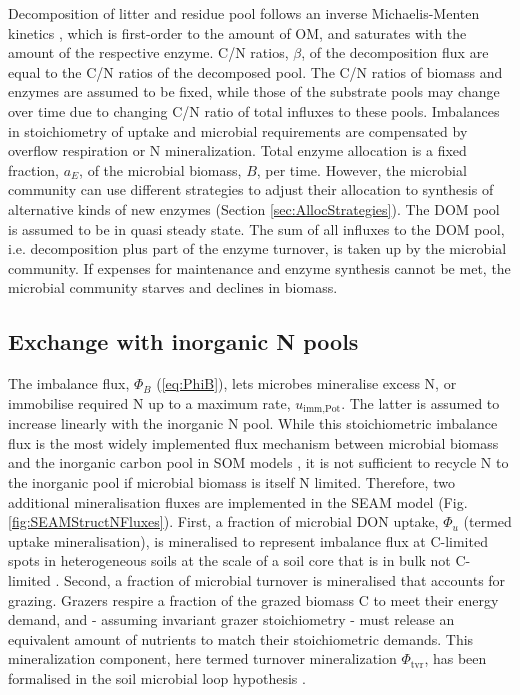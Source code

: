  

Decomposition of litter and residue pool follows an inverse Michaelis-Menten
kinetics \citep{Schimel03}, which is first-order to the amount of OM, and
saturates with the amount of the respective enzyme. C/N ratios, $\beta$, of the
decomposition flux are equal to the C/N ratios of the decomposed pool. The C/N
ratios of biomass and enzymes are assumed to be fixed, while those of the
substrate pools may change over time due to changing C/N ratio of total
influxes to these pools. Imbalances in stoichiometry of
uptake and microbial requirements are compensated by overflow respiration or N
mineralization.
Total enzyme allocation is a fixed fraction, $a_E$, of the microbial biomass,
$B$, per time. However, the microbial community can use different strategies to
adjust their allocation to synthesis of alternative kinds of new enzymes
(Section \ref{sec:AllocStrategies}).
The DOM pool is assumed to be in quasi steady state. The sum of all influxes to
the DOM pool, i.e. decomposition plus part of the enzyme turnover, is taken up
by the microbial community. If expenses for maintenance and enzyme synthesis
cannot be met, the microbial community starves and declines in biomass.

\subsection{Exchange with inorganic N pools}


The imbalance flux, $\Phi_B$ (\ref{eq:PhiB}), lets microbes mineralise excess N,
or immobilise required N up to a maximum rate, $u_{\operatorname{imm,Pot}}$. The
latter is assumed to increase linearly with the inorganic N pool.
While this stoichiometric imbalance flux is the most widely implemented flux
mechanism between microbial biomass and the inorganic carbon pool in SOM models
\citep{Manzoni09}, it is not sufficient to recycle N to the inorganic pool if
microbial biomass is itself N limited.
Therefore, two additional mineralisation fluxes are implemented in the SEAM
model (Fig. \ref{fig:SEAMStructNFluxes}). First, a fraction of microbial DON
uptake, $\Phi_u$ (termed uptake mineralisation), is  mineralised to
represent imbalance flux at C-limited spots in heterogeneous soils at
the scale of a soil core that is in bulk not C-limited 
\citep{Manzoni08}.
Second, a fraction of microbial turnover is mineralised that accounts for
grazing. Grazers respire a fraction of the grazed biomass C to meet their energy
demand, and - assuming invariant grazer stoichiometry  - must release an
equivalent amount of nutrients to match their stoichiometric demands.
This mineralization component, here termed turnover mineralization
$\Phi_{\operatorname{tvr}}$, has been formalised in the soil microbial loop
hypothesis \citep{Clarholm85, Raynaud06}.

